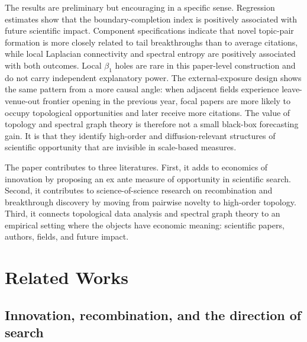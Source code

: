 \documentclass[preprint,12pt,authoryear]{elsarticle}
\begin{document}
The results are preliminary but encouraging in a specific sense. Regression estimates show that the boundary-completion index is positively associated with future scientific impact. Component specifications indicate that novel topic-pair formation is more closely related to tail breakthroughs than to average citations, while local Laplacian connectivity and spectral entropy are positively associated with both outcomes. Local $\beta_1$ holes are rare in this paper-level construction and do not carry independent explanatory power. The external-exposure design shows the same pattern from a more causal angle: when adjacent fields experience leave-venue-out frontier opening in the previous year, focal papers are more likely to occupy topological opportunities and later receive more citations. The value of topology and spectral graph theory is therefore not a small black-box forecasting gain. It is that they identify high-order and diffusion-relevant structures of scientific opportunity that are invisible in scale-based measures.

The paper contributes to three literatures. First, it adds to economics of innovation by proposing an ex ante measure of opportunity in scientific search. Second, it contributes to science-of-science research on recombination and breakthrough discovery by moving from pairwise novelty to high-order topology. Third, it connects topological data analysis and spectral graph theory \citep{edelsbrunner2002topological,zomorodian2005computing,chung1997spectral,forman2003bochner} to an empirical setting where the objects have economic meaning: scientific papers, authors, fields, and future impact.

\section{Related Works}

\subsection{Innovation, recombination, and the direction of search}
\end{document}
